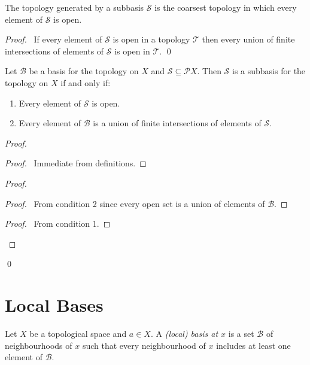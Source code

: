 \begin{prop}
  \label{prop:subbasis:coarsest}
  The topology generated by a subbasis $\mathcal{S}$ is the coarsest topology in which every element of $\mathcal{S}$ is open.
\end{prop}

\begin{proof}
  \pf\ If every element of $\mathcal{S}$ is open in a topology $\mathcal{T}$ then every union of finite intersections of elements of $\mathcal{S}$ is open in $\mathcal{T}$. \qed
\end{proof}

\begin{prop}
  \label{prop:subbasis:from_basis}
  Let $\mathcal{B}$ be a basis for the topology on $X$ and $\mathcal{S} \subseteq \mathcal{P} X$. Then $\mathcal{S}$ is a subbasis for the topology on $X$ if and only if:
  \begin{enumerate}
    \item
    Every element of $\mathcal{S}$ is open.
    \item
    Every element of $\mathcal{B}$ is a union of finite intersections of elements of $\mathcal{S}$.
  \end{enumerate}
\end{prop}

\begin{proof}
  \pf
  \begin{proof}
    \pf\ Immediate from definitions.
  \end{proof}
  \begin{proof}
    \begin{proof}
      \pf\ From condition 2 since every open set is a union of elements of $\mathcal{B}$.
    \end{proof}
    \begin{proof}
      \pf\ From condition 1.
    \end{proof}
  \end{proof}
  \qed
\end{proof}

\section{Local Bases}

\begin{df}
  Let $X$ be a topological space and $a \in X$. A \emph{(local) basis at $x$} is a set $\mathcal{B}$ of neighbourhoods of $x$ such that every neighbourhood of $x$ includes at least one element of $\mathcal{B}$.
\end{df}
